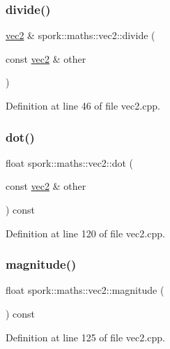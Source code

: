 \subsubsection{\texorpdfstring{divide()}{divide()}}
{\footnotesize\ttfamily \hyperlink{structspork_1_1maths_1_1vec2}{vec2} \& spork\+::maths\+::vec2\+::divide (\begin{DoxyParamCaption}\item[{const \hyperlink{structspork_1_1maths_1_1vec2}{vec2} \&}]{other }\end{DoxyParamCaption})}



Definition at line 46 of file vec2.\+cpp.

\mbox{\label{structspork_1_1maths_1_1vec2_a482cdb63a5860e0a29f039d91b24dc5a}} 
\subsubsection{\texorpdfstring{dot()}{dot()}}
{\footnotesize\ttfamily float spork\+::maths\+::vec2\+::dot (\begin{DoxyParamCaption}\item[{const \hyperlink{structspork_1_1maths_1_1vec2}{vec2} \&}]{other }\end{DoxyParamCaption}) const}



Definition at line 120 of file vec2.\+cpp.

\mbox{\label{structspork_1_1maths_1_1vec2_a412737e35d7129a24ff0bde53f4c3976}} 
\subsubsection{\texorpdfstring{magnitude()}{magnitude()}}
{\footnotesize\ttfamily float spork\+::maths\+::vec2\+::magnitude (\begin{DoxyParamCaption}{ }\end{DoxyParamCaption}) const}



Definition at line 125 of file vec2.\+cpp.

\mbox{\label{structspork_1_1maths_1_1vec2_a6269af13cf61c95353e10a5823874f0c}} 

